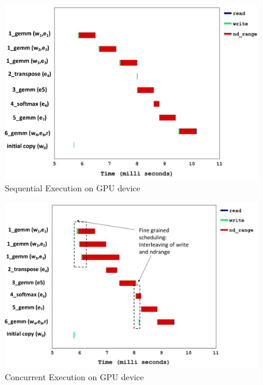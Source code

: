 	\begin{figure}[ht]  
		\centering
		\includegraphics[scale=0.35]{Pictures/motiv_sequential.pdf}
		\caption{Sequential Execution on GPU device\label{fig:motivation1}}
	\end{figure}
	\begin{figure}[ht]  
		\centering
		\includegraphics[scale=0.35]{Pictures/motiv_concurrent.pdf}
		\caption{Concurrent Execution on GPU device\label{fig:motivation2}}
	\end{figure}
